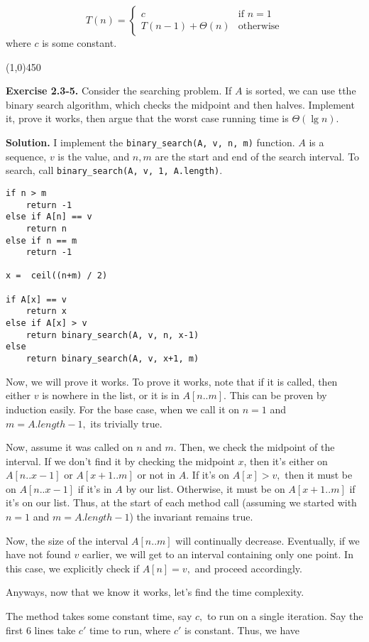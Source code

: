 \documentclass{article}
\newcommand{\exec}[2]
{\textbf{Exercise #1.} #2

\textbf{Solution.}}
\newcommand{\bardiv}{\begin{center}
\line(1,0){450}
\end{center}}
\begin{document}
$$T(n) = \begin{cases}
		c & \text{if }n = 1 \\
		T(n-1) + \Theta(n) & \text{otherwise}
	 \end{cases}$$
where $c$ is some constant.
\bardiv

\exec{2.3-5}{Consider the searching problem. If $A$ is sorted, we can use tthe binary search algorithm, which checks the midpoint and then halves. Implement it, prove it works, then argue that the worst case running time is $\Theta(\lg n).$}
I implement the \texttt{binary\_search(A, v, n, m)} function. $A$ is a sequence, $v$ is the value, and $n, m$ are the start and end of the search interval. To search, call \texttt{binary\_search(A, v, 1, A.length)}.

\begin{lstlisting}
if n > m
	return -1
else if A[n] == v
	return n
else if n == m
	return -1

x =  ceil((n+m) / 2)

if A[x] == v
	return x
else if A[x] > v
	return binary_search(A, v, n, x-1)
else
	return binary_search(A, v, x+1, m)
\end{lstlisting}

Now, we will prove it works. To prove it works, note that if it is called, then either $v$ is nowhere in the list, or it is in $A[n..m].$ This can be proven by induction easily. For the base case, when we call it on $n=1$ and $m=A.length-1,$ its trivially true.

Now, assume it was called on $n$ and $m.$ Then, we check the midpoint of the interval. If we don't find it by checking the midpoint $x$, then it's either on $A[n..x-1]$ or $A[x+1..m]$ or not in $A.$ If it's on $A[x] > v,$ then it must be on $A[n..x-1]$ if it's in $A$ by our list. Otherwise, it must be on $A[x+1..m]$ if it's on our list. Thus, at the start of each method call (assuming we started with $n=1$ and $m=A.length-1$) the invariant remains true.

Now, the size of the interval $A[n..m]$ will continually decrease. Eventually, if we have not found $v$ earlier, we will get to an interval containing only one point. In this case, we explicitly check if $A[n] = v,$ and proceed accordingly.

Anyways, now that we know it works, let's find the time complexity.

The method takes some constant time, say $c,$ to run on a single iteration. Say the first 6 lines take $c'$ time to run, where $c'$ is constant. Thus, we have
\end{document}
